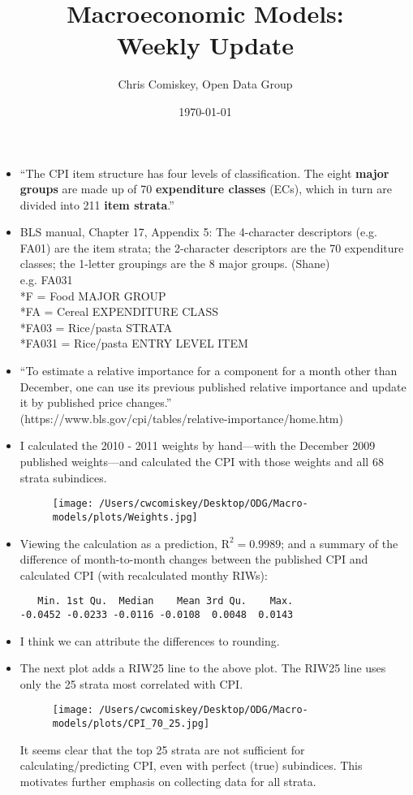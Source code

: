 \documentclass{article}
\title{Macroeconomic Models: \\ Weekly Update}
\author{Chris Comiskey, Open Data Group}
\date{\today}
\begin{document}
\maketitle{}

\begin{itemize}
\item ``The CPI item structure has four levels of classification. The eight {\bf major groups} are made up of 70 {\bf expenditure classes} (ECs), which in turn are divided into 211 {\bf item strata}.''

\item BLS manual, Chapter 17, Appendix 5: The 4-character descriptors (e.g. FA01) are the item strata; the 2-character descriptors are the 70 expenditure classes; the 1-letter groupings are the 8 major groups. (Shane) \\
e.g. FA031 \\
*F = Food MAJOR GROUP \\
*FA = Cereal EXPENDITURE CLASS \\
*FA03 = Rice/pasta STRATA \\
*FA031 = Rice/pasta ENTRY LEVEL ITEM

\item ``To estimate a relative importance for a component for a month other than December, one can use its previous published relative importance and update it by published price changes.'' \\ (https://www.bls.gov/cpi/tables/relative-importance/home.htm)

\item I calculated the 2010 - 2011 weights by hand---with the December 2009 published weights---and calculated the CPI with those weights and all 68 strata subindices.
    \begin{figure}[H]
    \centering
    \texttt{[image: /Users/cwcomiskey/Desktop/ODG/Macro-models/plots/Weights.jpg]}
    \end{figure}
\item Viewing the calculation as a prediction, $\text{R}^{2} = 0.9989$; and a summary of the difference of month-to-month changes between the published CPI and calculated CPI (with recalculated monthy RIWs): 
\begin{verbatim}
   Min. 1st Qu.  Median    Mean 3rd Qu.    Max. 
-0.0452 -0.0233 -0.0116 -0.0108  0.0048  0.0143
\end{verbatim}
\item I think we can attribute the differences to rounding.
\item The next plot adds a RIW25 line to the above plot. The RIW25 line uses only the 25 strata most correlated with CPI.
    \begin{figure}[H]
    \centering
    \texttt{[image: /Users/cwcomiskey/Desktop/ODG/Macro-models/plots/CPI\_70\_25.jpg]}
    \end{figure}
It seems clear that the top 25 strata are not sufficient for calculating/predicting CPI, even with perfect (true) subindices. This motivates further emphasis on collecting data for all strata.
\end{itemize}
\end{document}
